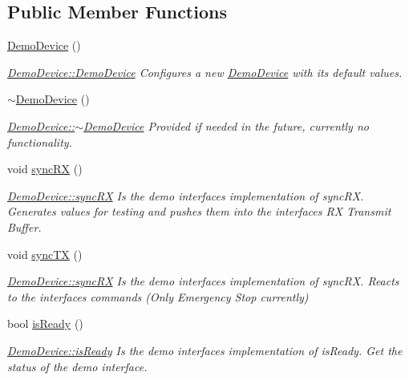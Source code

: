 \subsection*{Public Member Functions}
\begin{DoxyCompactItemize}
\item 
\hyperlink{class_demo_device_a9fc771c4152f0d9de78a69187cbd7a58}{Demo\+Device} ()
\begin{DoxyCompactList}\small\item\em \hyperlink{class_demo_device_a9fc771c4152f0d9de78a69187cbd7a58}{Demo\+Device\+::\+Demo\+Device} Configures a new \hyperlink{class_demo_device}{Demo\+Device} with its default values. \end{DoxyCompactList}\item 
\hyperlink{class_demo_device_aff994361f45ae993feb854f72a2a32a6}{$\sim$\+Demo\+Device} ()
\begin{DoxyCompactList}\small\item\em \hyperlink{class_demo_device_aff994361f45ae993feb854f72a2a32a6}{Demo\+Device\+::$\sim$\+Demo\+Device} Provided if needed in the future, currently no functionality. \end{DoxyCompactList}\item 
void \hyperlink{class_demo_device_a85671c408f6f08d82a09344ef5f34966}{sync\+RX} ()
\begin{DoxyCompactList}\small\item\em \hyperlink{class_demo_device_a85671c408f6f08d82a09344ef5f34966}{Demo\+Device\+::sync\+RX} Is the demo interface\textquotesingle{}s implementation of sync\+RX. Generates values for testing and pushes them into the interface\textquotesingle{}s RX Transmit Buffer. \end{DoxyCompactList}\item 
void \hyperlink{class_demo_device_a4b33b0148627fcbd22a0704e80f05d7d}{sync\+TX} ()
\begin{DoxyCompactList}\small\item\em \hyperlink{class_demo_device_a85671c408f6f08d82a09344ef5f34966}{Demo\+Device\+::sync\+RX} Is the demo interface\textquotesingle{}s implementation of sync\+RX. Reacts to the interfaces commands (Only Emergency Stop currently) \end{DoxyCompactList}\item 
bool \hyperlink{class_demo_device_aaadb9ced56699af55526b9fc7cf8420c}{is\+Ready} ()
\begin{DoxyCompactList}\small\item\em \hyperlink{class_demo_device_aaadb9ced56699af55526b9fc7cf8420c}{Demo\+Device\+::is\+Ready} Is the demo interface\textquotesingle{}s implementation of is\+Ready. Get the status of the demo interface. \end{DoxyCompactList}\item 

\end{DoxyCompactItemize}
